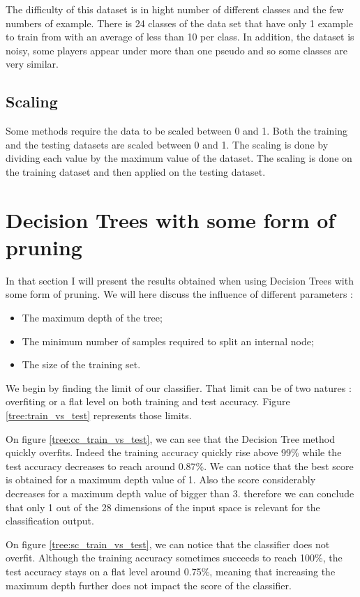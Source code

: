 \documentclass[twocolumn, a4paper, 10pt]{article}
\begin{document}
			The difficulty of this dataset is in hight number of different classes and the few numbers of example. There is 24 classes of the data set that have only 1 example to train from with an average of less than 10 per class. In addition, the dataset is noisy, some players appear under more than one pseudo and so some classes are very similar.

		\subsection*{Scaling}
			Some methods require the data to be scaled between 0 and 1. Both the training and the testing datasets are scaled between 0 and 1. The scaling is done by dividing each value by the maximum value of the dataset. The scaling is done on the training dataset and then applied on the testing dataset.
	\section{Decision Trees with some form of pruning}
		In that section I will present the results obtained when using Decision Trees with some form of pruning. We will here discuss the influence of different parameters :
		\begin{itemize}
			\item The maximum depth of the tree;
			\item The minimum number of samples required to split an internal node;
			\item The size of the training set.
		\end{itemize}

		We begin by finding the limit of our classifier. That limit can be of two natures : overfiting or a flat level on both training and test accuracy. Figure \ref{tree:train_vs_test} represents those limits.

		On figure \ref{tree:cc_train_vs_test}, we can see that the Decision Tree method quickly overfits. Indeed the training accuracy quickly rise above 99\% while the test accuracy decreases to reach around 0.87\%. We can notice that the best score is obtained for a maximum depth value of 1. Also the score considerably decreases for a maximum depth value of bigger than 3. therefore we can conclude that only 1 out of the 28 dimensions of the input space is relevant for the classification output.

		On figure \ref{tree:sc_train_vs_test}, we can notice that the classifier does not overfit. Although the training accuracy sometimes succeeds to reach 100\%, the test accuracy stays on a flat level around 0.75\%, meaning that increasing the maximum depth further does not impact the score of the classifier.
\end{document}
